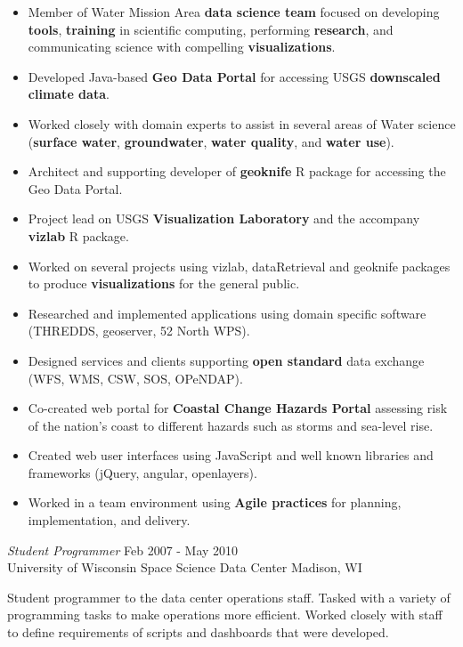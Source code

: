 \documentclass[line,margin]{res}
\begin{document}
\begin{resume}
	     \begin{itemize} \itemsep -2pt %
		\item Member of Water Mission Area \textbf{data science team} focused on developing \textbf{tools}, \textbf{training} in scientific computing, performing \textbf{research}, and communicating science with compelling \textbf{visualizations}.
		\item Developed Java-based \textbf{Geo Data Portal} for accessing USGS \textbf{downscaled climate data}.
		\item Worked closely with domain experts to assist in several areas of Water science (\textbf{surface water}, \textbf{groundwater}, \textbf{water quality}, and \textbf{water use}).
		\item Architect and supporting developer of \textbf{geoknife} R package for accessing the Geo Data Portal.
		\item Project lead on USGS \textbf{Visualization Laboratory} and the accompany \textbf{vizlab} R package.
		\item Worked on several projects using vizlab, dataRetrieval and geoknife packages to produce \textbf{visualizations} for the general public.
		\item Researched and implemented applications using domain specific software (THREDDS, geoserver, 52 North WPS).
		\item Designed services and clients supporting \textbf{open standard} data exchange (WFS, WMS, CSW, SOS, OPeNDAP).
		\item Co-created web portal for \textbf{Coastal Change Hazards Portal} assessing risk of the nation's coast to different hazards such as storms and sea-level rise.
		\item Created web user interfaces using JavaScript and well known libraries and frameworks (jQuery, angular, openlayers).
		\item Worked in a team environment using \textbf{Agile practices} for planning, implementation, and delivery.
	     \end{itemize}

		{\sl Student Programmer} \hfill Feb 2007 - May 2010 \\
		University of Wisconsin Space Science Data Center \hfill Madison, WI
                
		Student programmer to the data center operations staff.  Tasked with a variety of programming tasks to make operations more efficient.  Worked closely with staff to define requirements of scripts and dashboards that were developed.


\end{resume}
\end{document}
